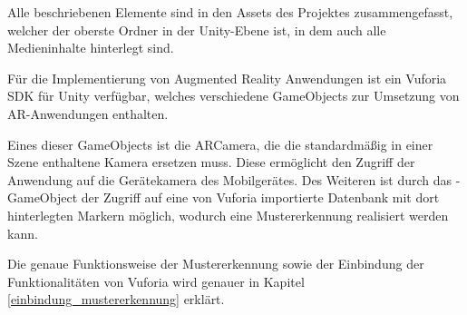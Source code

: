 Alle beschriebenen Elemente sind in den Assets des Projektes zusammengefasst, welcher der oberste Ordner in der Unity-Ebene ist, in dem auch alle Medieninhalte hinterlegt sind.

Für die Implementierung von Augmented Reality Anwendungen ist ein Vuforia SDK für Unity verfügbar, welches verschiedene GameObjects zur Umsetzung von AR-Anwendungen enthalten.

Eines dieser GameObjects ist die ARCamera, die die standardmäßig in einer Szene enthaltene Kamera ersetzen muss. 
Diese ermöglicht den Zugriff der Anwendung auf die Gerätekamera des Mobilgerätes.
Des Weiteren ist durch das -GameObject der Zugriff auf eine von Vuforia importierte Datenbank mit dort hinterlegten Markern möglich, wodurch eine Mustererkennung realisiert werden kann.

Die genaue Funktionsweise der Mustererkennung sowie der Einbindung der Funktionalitäten von Vuforia wird genauer in Kapitel \ref{einbindung_mustererkennung} erklärt.